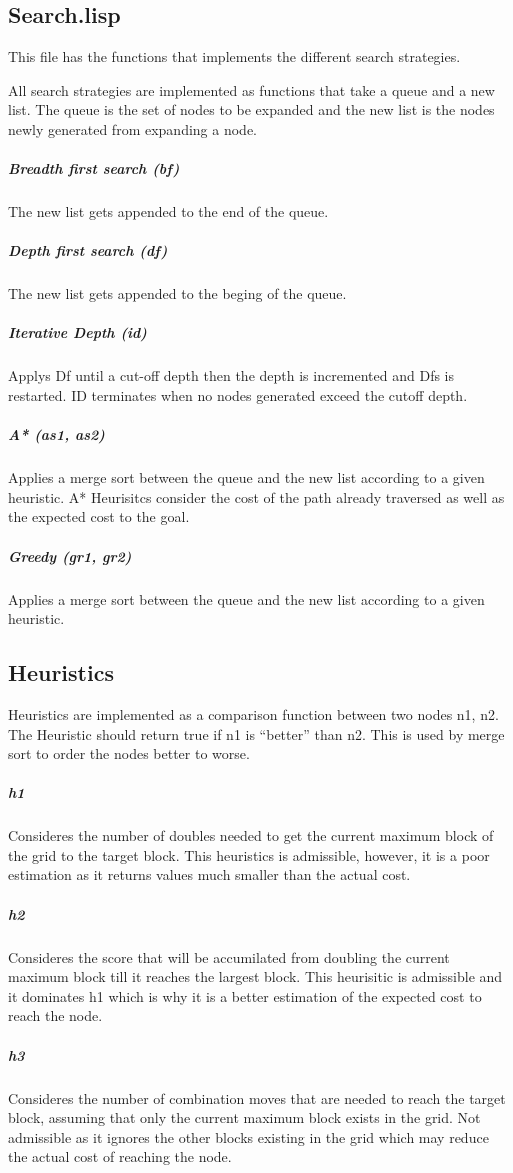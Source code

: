 \documentclass[paper=a4, fontsize=11pt]{scrartcl}
\numberwithin{equation}{section}		%
\numberwithin{figure}{section}			%
\numberwithin{table}{section}				%
\begin{document}
\subsection{Search.lisp}
This file has the functions that implements the different search strategies.

All search strategies are implemented as functions that take a queue and a new list. The queue is the set of nodes to be expanded and the new list is the nodes newly generated from expanding a node.

\subparagraph{Breadth first search (bf)}
The new list gets appended to the end of the queue.

\subparagraph{Depth first search (df)}
The new list gets appended to the beging of the queue.

\subparagraph{Iterative Depth (id)}
Applys Df until a cut-off depth then the depth is incremented and Dfs is restarted. ID terminates when no nodes generated exceed the cutoff depth.

\subparagraph{A* (as1, as2)}
Applies a merge sort between the queue and the new list according to a given heuristic.
A* Heurisitcs consider the cost of the path already traversed as well as the expected
cost to the goal.

\subparagraph{Greedy (gr1, gr2)}
Applies a merge sort between the queue and the new list according to a given heuristic.

\subsection{Heuristics}
Heuristics are implemented as a comparison function between two nodes n1, n2. The Heuristic should return true if n1 is ``better'' than n2. This is used by merge sort to order the nodes better to worse.

\subparagraph{h1} Consideres the number of doubles needed to get the current maximum block of the grid to the target block. This heuristics is admissible, however, it is a poor estimation as it returns values much smaller than the actual cost.

\subparagraph{h2}
Consideres the score that will be accumilated from doubling the current maximum block till it reaches the largest block.
This heurisitic is admissible and it dominates h1 which is why it is a better estimation of the expected cost to reach the node.
 
\subparagraph{h3}
Consideres the number of combination moves that are needed to reach the target block, assuming that only the current maximum block exists in the grid.
Not admissible as it ignores the other blocks existing in the grid which may reduce the actual cost of reaching the node.
\end{document}
